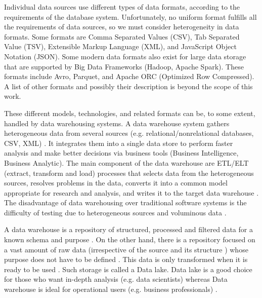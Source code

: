 				Individual data sources use different types of data formats, according to the requirements of the database system. Unfortunately, no uniform format fulfills all the requirements of data sources, so we must consider heterogeneity in data formats. Some formats are Comma Separated Values (CSV), Tab Separated Value (TSV), Extensible Markup Language (XML), and JavaScript Object Notation (JSON). Some modern data formats also exist for large data storage that are supported by Big Data Frameworks (Hadoop, Apache Spark). These formats include Avro, Parquet, and Apache ORC (Optimized Row Compressed). A list of other formats and possibly their description is beyond the scope of this work. 	
					
				These different models, technologies, and related formats can be, to some extent, handled by data warehousing systems. A data warehouse system gathers heterogeneous data from several sources (e.g. relational/nonrelational databases, CSV, XML) \cite{Homayouni2019}. It integrates them into a single data store to perform faster analysis and make better decisions via business tools (Business Intelligence, Business Analytic). The main component of the data warehouse are ETL/ELT (extract, transform and load) processes that selects data from the heterogeneous sources, resolves problems in the data, converts it into a common model appropriate for research and analysis, and writes it to the target data warehouse \cite{Homayouni2019}. The disadvantage of data warehousing over traditional software systems is the difficulty of testing due to heterogeneous sources and voluminous data \cite{Homayouni2019}.					
			
				A data warehouse is a repository of structured, processed and filtered data for a known schema and purpose \cite{Homayouni2019}. On the other hand, there is a repository focused on a vast amount of raw data (irrespective of the source and its structure \cite{Kumar2020}) whose purpose does not have to be defined \cite{Pearlman2019}.  This data is only transformed when it is ready to be used \cite{Pearlman2019}. Such storage is called a Data lake. Data lake is a good choice for those who want in-depth analysis (e.g. data scientists) whereas Data warehouse is ideal for operational users (e.g. business professionals) \cite{Pearlman2019}.
			

